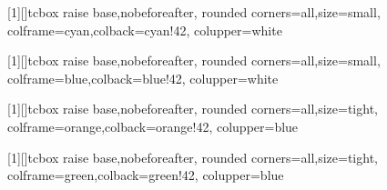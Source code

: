 \usepackage{tcolorbox}

\newtcbox{\langBox}[1][]{tcbox raise base,nobeforeafter,
  rounded corners=all,size=small,
  colframe=cyan,colback=cyan!42,
  colupper=white}

\newtcbox{\tagBox}[1][]{tcbox raise base,nobeforeafter,
  rounded corners=all,size=small,
  colframe=blue,colback=blue!42,
  colupper=white}

\newtcbox{\shortBox}[1][]{tcbox raise base,nobeforeafter,
  rounded corners=all,size=tight,
  colframe=orange,colback=orange!42,
  colupper=blue}

\newtcbox{\detailBox}[1][]{tcbox raise base,nobeforeafter,
  rounded corners=all,size=tight,
  colframe=green,colback=green!42,
  colupper=blue}

\newcommand{\langTag}[1]{\langBox{\uppercase{\scriptsize{#1}}}}
\newcommand{\disTag}[1]{\tagBox{\footnotesize{#1}}}
\newcommand{\tldrTag}[1]{\noindent\shortBox{\footnotesize{#1}}}
\newcommand{\deepTag}[1]{\noindent\detailBox{\footnotesize{#1}}}
